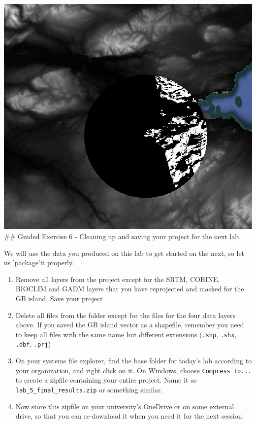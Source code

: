 \documentclass[
  letterpaper,
  DIV=11,
  numbers=noendperiod]{scrreprt}
\begin{document}
\includegraphics{images/lab_5/lab5_fig8_viewshed.jpg} \#\# Guided
Exercise 6 - Cleaning up and saving your project for the next lab

We will use the data you produced on this lab to get started on the
next, so let us 'package'it properly.

\begin{enumerate}
\def\labelenumi{(\arabic{enumi})}
\setcounter{enumi}{156}
\item
  Remove all layers from the project except for the SRTM, CORINE,
  BIOCLIM and GADM layers that you have reprojected and masked for the
  GB island. Save your project
\item
  Delete all files from the folder except for the files for the four
  data layers above. If you saved the GB island vector as a shapefile,
  remember you need to keep all files with the same name but different
  extensions (\texttt{.shp}, \texttt{.shx}, \texttt{.dbf},
  \texttt{.prj})
\item
  On your systems file explorer, find the base folder for today's lab
  according to your organization, and right click on it. On Windows,
  choose \texttt{Compress\ to...} to create a zipfile containing your
  entire project. Name it as \texttt{lab\_5\_final\_results.zip} or
  something similar.
\item
  Now store this zipfile on your university's OneDrive or on some
  external drive, so that you can re-download it when you need it for
  the next session.
\end{enumerate}
\end{document}
